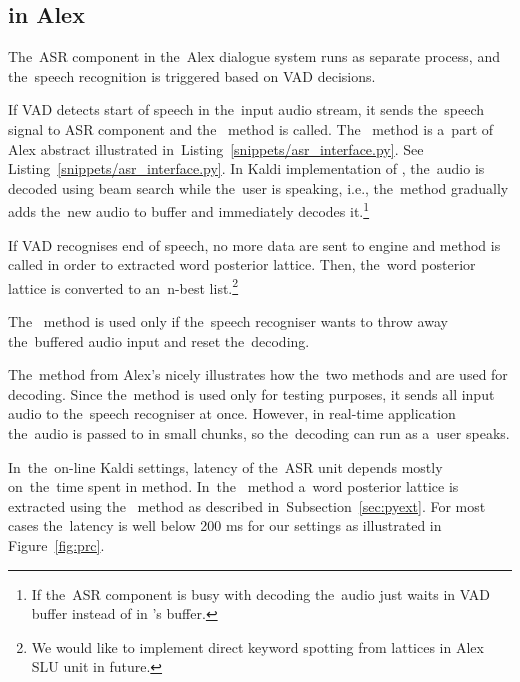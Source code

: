 \subsection{ in Alex}
\label{sub:asr_component}
The~\ac{ASR} component in the~Alex dialogue system runs as separate process, and the~speech recognition is triggered based on \ac{VAD} decisions.

If \ac{VAD} detects start of speech in the~input audio stream, it sends the~speech signal to \ac{ASR} component and the~ method is called. 
The~ method is a~part of Alex abstract  illustrated in~Listing~\ref{snippets/asr_interface.py}.
See Listing~\ref{snippets/asr_interface.py}.
In Kaldi implementation of , the~audio is decoded using beam search while the~user is speaking, i.e., the~method  gradually adds the~new audio to  buffer and immediately decodes it.\footnote{If the~\ac{ASR} component is busy with decoding the~audio just waits in \ac{VAD} buffer instead of in 's buffer.}

If \ac{VAD} recognises end of speech, no more data are sent to  engine and  method is called in order to extracted word posterior lattice.
Then, the~word posterior lattice is converted to an~n-best list.\footnote{We would like to implement direct keyword spotting from  lattices in Alex \ac{SLU} unit in future.}

The~ method is used only if the~speech recogniser wants to throw away the~buffered audio input and reset the~decoding.


The~method  from Alex's  nicely illustrates how the~two methods  and  are used for decoding. 
Since the~method is used only for testing purposes, it sends all input audio to the~speech recogniser at once.
However, in real-time application the~audio is passed to  in small chunks, so the~decoding can run as a~user speaks. 

In~the~on-line Kaldi settings, latency of the~\ac{ASR} unit depends mostly on~the~time spent in  method.
In~the~ method a~word posterior lattice is extracted using the~ method as described in~Subsection~\ref{sec:pyext}. 
For most cases the~latency is well below 200 ms for our settings as illustrated in Figure~\ref{fig:prc}.

